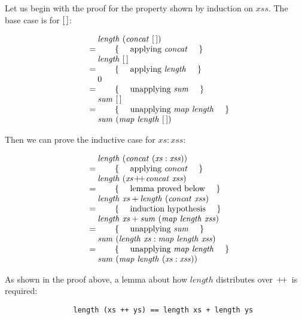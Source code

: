 \begin{parts}
\begin{solution}
        Let us begin with the proof for the property shown by induction on $\mathit{xss}$. The base case is for $\hslist{}$:
        
        \begin{displaymath}
        \begin{array}{cl}
        \expr{\mathit{length}~(\mathit{concat}~\hslist{})}
        \hint{applying $\mathit{concat}$}
        \expr{\mathit{length}~\hslist{}}
        \hint{applying $\mathit{length}$}
        \expr{0}
        \hint{unapplying $\mathit{sum}$}
        \expr{\mathit{sum}~\hslist{}}
        \hint{unapplying $\mathit{map}~\mathit{length}$}
        \lastexpr{\mathit{sum}~(\mathit{map}~\mathit{length}~\hslist{})}
        \end{array}
        \end{displaymath}
        
        Then we can prove the inductive case for $\mathit{xs}:\mathit{xss}$:
        
        \begin{displaymath}
        \begin{array}{cl}
        \expr{\mathit{length}~(\mathit{concat}~(\mathit{xs}:\mathit{xss}))}
        \hint{applying $\mathit{concat}$}
        \expr{\mathit{length}~(\mathit{xs} \append \mathit{concat}~\mathit{xss})}
        \hint{lemma proved below}
        \expr{\mathit{length}~\mathit{xs} + \mathit{length}~(\mathit{concat}~\mathit{xss})}
        \hint{induction hypothesis}
        \expr{\mathit{length}~\mathit{xs} + \mathit{sum}~(\mathit{map}~\mathit{length}~\mathit{xss})}
        \hint{unapplying $\mathit{sum}$}
        \expr{\mathit{sum}~(\mathit{length}~\mathit{xs} : \mathit{map}~\mathit{length}~\mathit{xss})}
        \hint{unapplying $\mathit{map}~\mathit{length}$}
        \lastexpr{\mathit{sum}~(\mathit{map}~\mathit{length}~(\mathit{xs}:\mathit{xss}))}
        \end{array}
        \end{displaymath}
        
        As shown in the proof above, a lemma about how $\mathit{length}$ distributes over $\append$ is required:
        
        \begin{center}
            \begin{small}
                \begin{verbatim}
                length (xs ++ ys) == length xs + length ys
                \end{verbatim}
            \end{small}
        \end{center}
        

\end{solution}
\end{parts}
